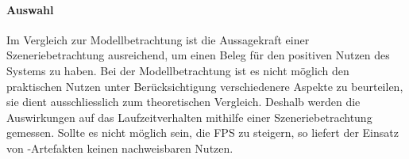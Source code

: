 \paragraph{Auswahl}
Im Vergleich zur Modellbetrachtung ist die Aussagekraft einer Szeneriebetrachtung ausreichend, um einen Beleg für den positiven Nutzen des Systems zu haben. Bei der Modellbetrachtung ist es nicht möglich den praktischen Nutzen unter Berücksichtigung verschiedenere Aspekte zu beurteilen, sie dient ausschliesslich zum theoretischen Vergleich. Deshalb werden die Auswirkungen auf das Laufzeitverhalten mithilfe einer Szeneriebetrachtung gemessen. Sollte es nicht möglich sein, die \gls{FPS} zu steigern, so liefert der Einsatz von -Artefakten keinen nachweisbaren Nutzen.
